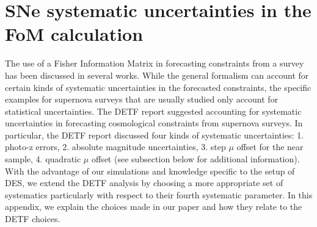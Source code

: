 \documentclass[preprint2]{aastex}    %
\begin{document}
\section{SNe systematic uncertainties in the FoM calculation}\label{apdx:fom}
The use of a Fisher Information Matrix in forecasting constraints from a 
survey has been discussed in several works. While the general formalism 
can account for certain kinds of systematic uncertainties 
in the forecasted constraints, the specific examples for supernova 
surveys that are usually studied only account for 
statistical uncertainties. 
The DETF report suggested accounting for systematic uncertainties in 
forecasting cosmological constraints from supernova surveys. In 
particular,  the DETF report discussed four kinds of systematic uncertainties: 
1. photo-z errors, 2. absolute magnitude uncertainties, 3. step $\mu$ offset for the near sample, 
4. quadratic $\mu$ offset (see subsection below for additional information). 
With the advantage of our simulations and knowledge specific to the 
setup of DES,  we extend the DETF analysis by choosing a more 
appropriate set of systematics particularly with respect to their fourth 
systematic parameter.
In this appendix, we explain the choices made in our paper and how they 
relate to the DETF choices.
\end{document}
